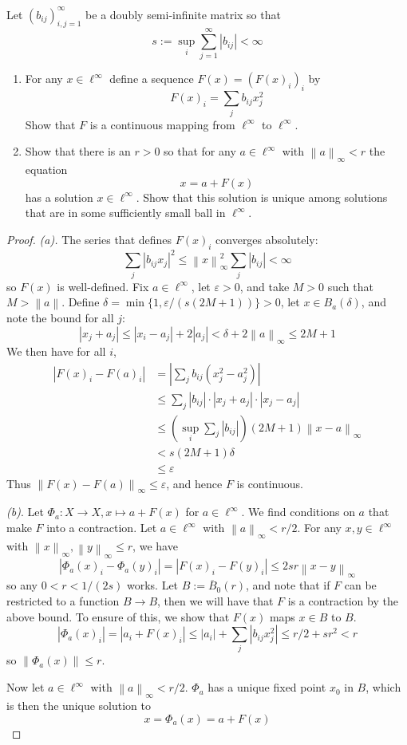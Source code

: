 \documentclass{article}
\newcommand{\cl}[1]{\overline{#1}}
\newcommand{\norm}[1]{\left\|#1\right\|}
\newcommand{\supnorm}[1]{\left\|#1\right\|_{\infty}}
\theoremstyle{definition} %
\numberwithin{thm}{section} %
\theoremstyle{definition} %
\begin{document}
Let $(b_{ij})^\infty_{i,j=1}$ be a doubly semi-infinite matrix so that
\[
    s := \sup_i \sum_{j = 1}^\infty |b_{ij}| < \infty  
\]
\begin{enumerate}[label=(\alph*)]
    \item For any $x \in \ell^\infty$ define a sequence 
    $F(x) = (F(x)_i)_i$ by
    \[
        F(x)_i = \sum_j b_{ij}x_j^2  
    \]
    Show that $F$ is a continuous mapping from $\ell^\infty$ 
    to $\ell^\infty$.
    \item Show that there is an $r > 0$ so that for any 
    $a \in \ell^\infty$ with $\supnorm{a} < r$ the equation
    \[
        x = a + F(x)  
    \]
    has a solution $x \in \ell^\infty$. Show that this solution 
    is unique among solutions that are
    in some sufficiently small ball in $\ell^\infty$.
\end{enumerate}
\begin{proof}
\textit{(a).}
The series that defines $F(x)_i$ converges absolutely:
\[
    \sum_j |b_{ij}x_j|^2 \leq \supnorm{x}^2 \sum_j |b_{ij}| < \infty
\]
so $F(x)$ is well-defined. Fix $a \in \ell^\infty$, let 
$\varepsilon > 0$, and take $M > 0$ such that $M > \norm{a}$. 
Define $\delta = \min\{1, \varepsilon/(s(2M + 1))\} > 0$,
let $x \in B_a(\delta)$, and note the bound for all $j$:
\[
    |x_j + a_j| \leq |x_i - a_j| + 2|a_j| 
    < \delta + 2\supnorm{a} \leq 2M + 1
\]
We then have for all $i$,
\begin{align*}
    |F(x)_i - F(a)_i|
    &= \left|\sum_j b_{ij}(x_j^2 - a_j^2)\right| \\
    &\leq \sum_j |b_{ij}| \cdot |x_j + a_j| \cdot |x_j - a_j| \\
    &\leq \left(\sup_i \sum_j |b_{ij}|\right)(2M + 1)\supnorm{x - a} \\
    &< s(2M + 1)\delta \\
    &\leq \varepsilon
\end{align*}
Thus $\supnorm{F(x) - F(a)} \leq \varepsilon$, and hence $F$ is continuous.

\textit{(b)}.
Let $\Phi_a: X \to X, x \mapsto a + F(x)$ for $a \in \ell^\infty$.
We find conditions on $a$ that make $F$ into a contraction. 
Let $a \in \ell^\infty$ with $\supnorm{a} < r/2$.
For any $x, y \in \ell^\infty$ with 
$\supnorm{x}, \supnorm{y} \leq r$, we have
\[
    |\Phi_a(x)_i - \Phi_a(y)_i| = |F(x)_i - F(y)_i| \leq 2sr\supnorm{x - y}  
\]
so any $0 < r < 1/(2s)$ works. Let $B := \cl{B}_0(r)$, and note 
that if $F$ can be restricted to a function $B \to B$, then we will
have that $F$ is a contraction by the above bound. To ensure of this,
we show that $F(x)$ maps $x \in B$ to $B$.
\[
    |\Phi_a(x)_i| = |a_i + F(x)_i| \leq 
    |a_i| + \sum_j |b_{ij}x_j^2| \leq r/2 + sr^2 < r
\]
so $\norm{\Phi_a(x)} \leq r$.

Now let $a \in \ell^\infty$ with $\supnorm{a} < r/2$. $\Phi_a$ has a unique
fixed point $x_0$ in $B$, which is then the unique solution to
\[
    x = \Phi_a(x) = a + F(x) 
\]
\end{proof}
\end{document}
